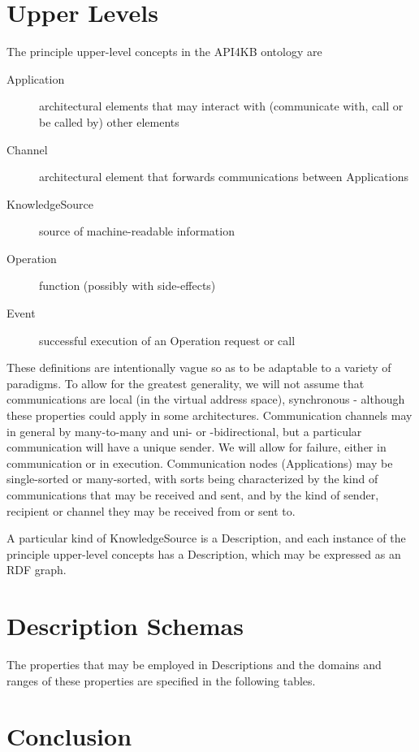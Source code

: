 \documentclass[runningheads]{llncs}
\begin{document}
\section{Upper Levels}
\label{upper}
The principle upper-level concepts in the API4KB ontology are
\begin{description}
\item[Application] architectural elements that may interact with (communicate with, call or be called by) other elements
\item[Channel] architectural element that forwards communications between Applications 
\item[KnowledgeSource] source of machine-readable information
\item[Operation] function (possibly with side-effects)
\item[Event] successful execution of an Operation request or call
\end{description}
These definitions are intentionally vague so as to be adaptable to a variety of paradigms. To allow for the greatest generality, we will not assume that communications are local (in the virtual address space), synchronous - although these properties could apply in some architectures. Communication channels may in general by many-to-many and uni- or -bidirectional, but a particular communication will have a unique sender. We will allow for failure, either in communication or in execution. Communication nodes (Applications) may be single-sorted or many-sorted, with sorts being characterized by the kind of communications that may be received and sent, and by the kind of sender, recipient or channel they may be received from or sent to.

A particular kind of KnowledgeSource is a Description, and each instance of the principle upper-level concepts has a Description, which may be expressed as an RDF graph.

\section{Description Schemas}
The properties that may be employed in Descriptions and the domains and ranges of these properties are specified in the following tables.



\section{Conclusion}
\label{conc}

%
%


\end{document}
